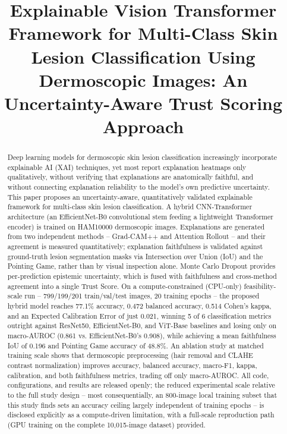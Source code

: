 \documentclass[conference]{IEEEtran}
\begin{document}
\title{Explainable Vision Transformer Framework for Multi-Class Skin Lesion Classification
Using Dermoscopic Images: An Uncertainty-Aware Trust Scoring Approach}

\author{
}

\maketitle

\begin{abstract}
Deep learning models for dermoscopic skin lesion classification increasingly incorporate
explainable AI (XAI) techniques, yet most report explanation heatmaps only qualitatively,
without verifying that explanations are anatomically faithful, and without connecting
explanation reliability to the model's own predictive uncertainty. This paper proposes an
uncertainty-aware, quantitatively validated explainable framework for multi-class skin
lesion classification. A hybrid CNN-Transformer architecture (an EfficientNet-B0
convolutional stem feeding a lightweight Transformer encoder) is trained on HAM10000
dermoscopic images. Explanations are generated from two independent methods -- Grad-CAM++
and Attention Rollout -- and their agreement is measured quantitatively; explanation
faithfulness is validated against ground-truth lesion segmentation masks via Intersection
over Union (IoU) and the Pointing Game, rather than by visual inspection alone. Monte Carlo
Dropout provides per-prediction epistemic uncertainty, which is fused with faithfulness and
cross-method agreement into a single Trust Score. On a compute-constrained (CPU-only)
feasibility-scale run -- 799/199/201 train/val/test images, 20 training epochs -- the
proposed hybrid model reaches 77.1\% accuracy, 0.472 balanced accuracy, 0.514 Cohen's kappa,
and an Expected Calibration Error of just 0.021, winning 5 of 6 classification metrics
outright against ResNet50, EfficientNet-B0, and ViT-Base baselines and losing only on
macro-AUROC (0.861 vs. EfficientNet-B0's 0.908), while achieving a mean faithfulness IoU of
0.196 and Pointing Game accuracy of 48.8\%. An ablation study at matched training scale
shows that dermoscopic preprocessing (hair removal and CLAHE contrast normalization)
improves accuracy, balanced accuracy, macro-F1, kappa, calibration, and both faithfulness
metrics, trading off only macro-AUROC. All code, configurations, and results are released
openly; the reduced experimental scale relative to the full study design -- most
consequentially, an 800-image local training subset that this study finds sets an accuracy
ceiling largely independent of training epochs -- is disclosed explicitly as a
compute-driven limitation, with a full-scale reproduction path (GPU training on the
complete 10,015-image dataset) provided.
\end{abstract}
\end{document}
